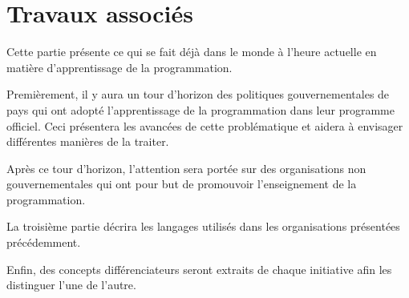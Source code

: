 \chapter{Travaux associés}
\label{travail associé}
Cette partie présente ce qui se fait déjà dans le monde à l'heure actuelle en matière d'apprentissage de la programmation.

Premièrement, il y aura un tour d'horizon des politiques gouvernementales de pays qui ont adopté l'apprentissage de la programmation dans leur programme officiel. Ceci présentera les avancées de cette problématique et aidera à envisager différentes manières de la traiter. 

Après ce tour d'horizon, l'attention sera portée sur des organisations non gouvernementales qui ont pour but de promouvoir l'enseignement de la programmation. 

La troisième partie décrira les langages utilisés dans les organisations présentées précédemment. 

Enfin, des concepts différenciateurs seront extraits de chaque initiative afin les distinguer l'une de l'autre.




